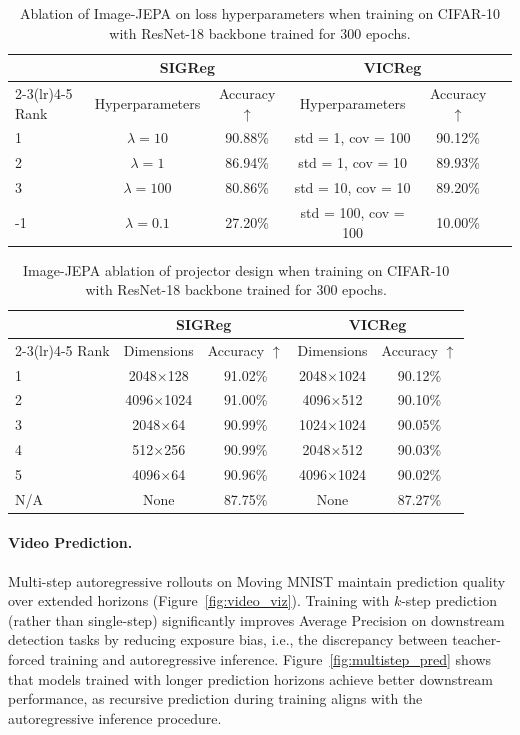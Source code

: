 \documentclass{article}
\begin{document}
\begin{table}[t]
\caption{Ablation of Image-JEPA on loss hyperparameters when training on CIFAR-10 with ResNet-18 backbone trained for 300 epochs.}
\label{tab:image_results_params}
\centering
\begin{tabular}{lccccc}
\toprule
     & \multicolumn{2}{c}{SIGReg} & \multicolumn{2}{c}{VICReg} \\
\cmidrule(lr){2-3}\cmidrule(lr){4-5}
Rank & Hyperparameters & Accuracy $\uparrow$ & Hyperparameters & Accuracy $\uparrow$ \\
\midrule
1  & $\lambda = 10$   & 90.88\% & std = 1, cov = 100   & 90.12\% \\
2  & $\lambda = 1$    & 86.94\% & std = 1, cov = 10    & 89.93\% \\
3  & $\lambda = 100$  & 80.86\% & std = 10, cov = 10   & 89.20\% \\
-1 & $\lambda = 0.1$  & 27.20\% & std = 100, cov = 100 & 10.00\% \\
\bottomrule
\end{tabular}
\end{table}


\begin{table}[t]
\caption{Image-JEPA ablation of projector design when training on CIFAR-10 with ResNet-18 backbone trained for 300 epochs.}
\label{tab:image_results_proj}
\centering
\begin{tabular}{lcccc}
\toprule
     & \multicolumn{2}{c}{SIGReg} & \multicolumn{2}{c}{VICReg} \\
\cmidrule(lr){2-3}\cmidrule(lr){4-5}
Rank & Dimensions & Accuracy $\uparrow$ & Dimensions & Accuracy $\uparrow$ \\
\midrule
1   & 2048$\times$128  & 91.02\% & 2048$\times$1024 & 90.12\% \\
2   & 4096$\times$1024 & 91.00\% & 4096$\times$512  & 90.10\% \\
3   & 2048$\times$64   & 90.99\% & 1024$\times$1024 & 90.05\% \\
4   & 512$\times$256   & 90.99\% & 2048$\times$512  & 90.03\% \\
5   & 4096$\times$64   & 90.96\% & 4096$\times$1024 & 90.02\% \\
N/A & None             & 87.75\% & None             & 87.27\% \\
\bottomrule
\end{tabular}
\end{table}


\paragraph{Video Prediction.}
Multi-step autoregressive rollouts on Moving MNIST maintain prediction quality over extended horizons (Figure~\ref{fig:video_viz}).
Training with $k$-step prediction (rather than single-step) significantly improves Average Precision on downstream detection tasks by reducing exposure bias, i.e., the discrepancy between teacher-forced training and autoregressive inference.
Figure~\ref{fig:multistep_pred} shows that models trained with longer prediction horizons achieve better downstream performance, as recursive prediction during training aligns with the autoregressive inference procedure.
\end{document}
